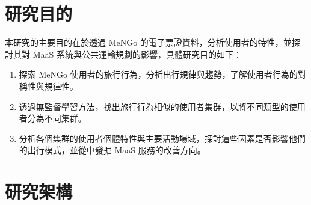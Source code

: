 \section{研究目的}\label{ux7814ux7a76ux76eeux7684}

本研究的主要目的在於透過 MeNGo
的電子票證資料，分析使用者的特性，並探討其對 MaaS
系統與公共運輸規劃的影響，具體研究目的如下：

\begin{enumerate}
\def\labelenumi{\arabic{enumi}.}
\tightlist
\item
  探索 MeNGo
  使用者的旅行行為，分析出行規律與趨勢，了解使用者行為的對稱性與規律性。
\item
  透過無監督學習方法，找出旅行行為相似的使用者集群，以將不同類型的使用者分為不同集群。
\item
  分析各個集群的使用者個體特性與主要活動場域，探討這些因素是否影響他們的出行模式，並從中發掘
  MaaS 服務的改善方向。
\end{enumerate}

\section{研究架構}\label{ux7814ux7a76ux67b6ux69cb}
